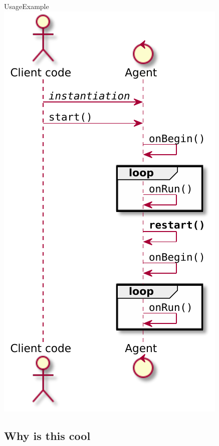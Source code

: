 \documentclass[presentation]{beamer}\mode<presentation>{\usetheme{AMSCesenaPurpleAndGold}}
\begin{document}
\begin{frame}{UsageExample}\centering
    \includegraphics[height=.8\textheight]{img/restarted-flow.pdf}
\end{frame}

\subsection{Why is this cool}
\end{document}
